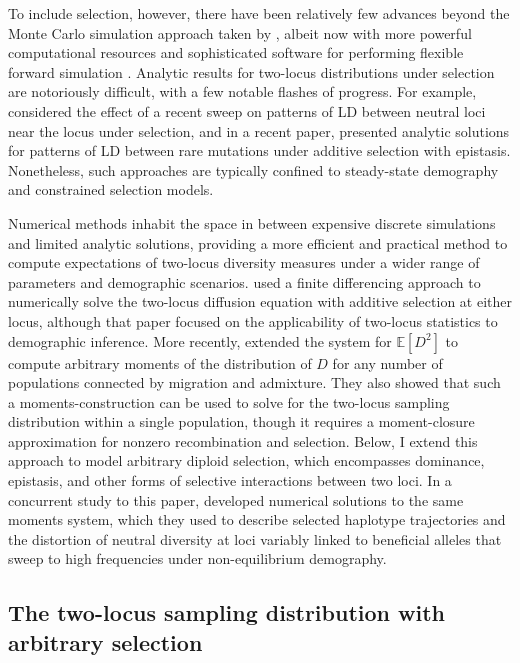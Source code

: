 \documentclass[]{article}
\newcommand{\E}{\mathbb{E}}
\begin{document}
To include selection, however, there have been relatively few advances beyond
the Monte Carlo simulation approach taken by \citet{Hill1966-gv}, albeit now
with more powerful computational resources and sophisticated software for
performing flexible forward simulation
\citep[e.g.][0]{Thornton2019-qc,Haller2019-vm}. Analytic results for two-locus
distributions under selection are notoriously difficult, with a few notable
flashes of progress. For example, \citet{McVean2007-xd} considered the effect
of a recent sweep on patterns of LD between neutral loci near the locus under
selection, and in a recent paper, \citet{Good2022-ot} presented analytic
solutions for patterns of LD between rare mutations under additive selection
with epistasis. Nonetheless, such approaches are typically confined to
steady-state demography and constrained selection models.

Numerical methods inhabit the space in between expensive discrete simulations
and limited analytic solutions, providing a more efficient and practical method
to compute expectations of two-locus diversity measures under a wider range of
parameters and demographic scenarios. \citet{Ragsdale2017-gg} used a finite
differencing approach to numerically solve the two-locus diffusion equation
with additive selection at either locus, although that paper focused on the
applicability of two-locus statistics to demographic inference. More recently,
\citet{Ragsdale2019-nt} extended the \citet{Hill1968-vu} system for \(\E[D^2]\)
to compute arbitrary moments of the distribution of \(D\) for any number of
populations connected by migration and admixture. They also showed that such a
moments-construction can be used to solve for the two-locus sampling
distribution within a single population, though it requires a moment-closure
approximation for nonzero recombination and selection. Below, I extend this
approach to model arbitrary diploid selection, which encompasses dominance,
epistasis, and other forms of selective interactions between two loci. In a
concurrent study to this paper, \citet{Friedlander2022-bs} developed numerical
solutions to the same moments system, which they used to describe selected
haplotype trajectories and the distortion of neutral diversity at loci variably
linked to beneficial alleles that sweep to high frequencies under
non-equilibrium demography.

\subsection{The two-locus sampling distribution with arbitrary selection}
\end{document}
